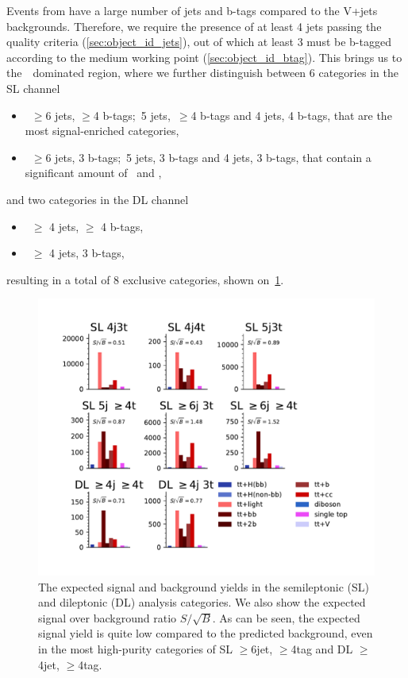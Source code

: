 Events from \ttHbb\xspace have a large number of jets and b-tags compared to the V+jets backgrounds. Therefore, we require the presence of at least 4 jets passing the quality criteria (\cref{sec:object_id_jets}), out of which at least 3 must be b-tagged according to the medium working point (\cref{sec:object_id_btag}). This brings us to the~\ttbar~dominated region, where we further distinguish between 6 categories in the SL channel
\begin{itemize}
\item~$\geq$6 jets, $\geq$4 b-tags;\ 5 jets,\ $\geq$4 b-tags and 4 jets, 4 b-tags, that are the most signal-enriched categories,
\item~$\geq$6 jets, 3 b-tags;\ 5 jets, 3 b-tags and 4 jets, 3 b-tags, that contain a significant amount of \ttcc~and \ttbb,
\end{itemize}
and two categories in the DL channel
\begin{itemize}
\item~$\geq$ 4 jets, $\geq$ 4 b-tags,
\item~$\geq$ 4 jets, 3 b-tags,
\end{itemize}
resulting in a total of 8 exclusive categories, shown on~\cref{fig:tth_pies}.

\begin{figure}
\begin{centering}
\includegraphics[width = 1.0\textwidth]{figures/tth/pies.pdf}
\caption[The expected signal and background yields in the analysis categories]{The expected signal and background yields in the semileptonic (SL) and dileptonic (DL) analysis categories. We also show the expected signal over background ratio $S / \sqrt{B}$. As can be seen, the expected signal yield is quite low compared to the predicted background, even in the most high-purity categories of SL $\geq$6jet, $\geq$4tag and DL $\geq$4jet, $\geq$4tag.}
\label{fig:tth_pies}
\end{centering}
\end{figure}

